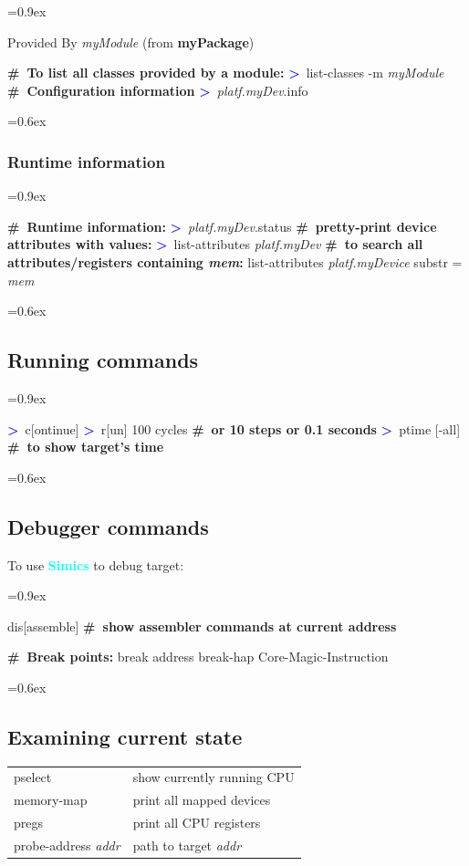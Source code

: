 \documentclass[8pt]{extarticle}
\newenvironment{code}[1][]{%
\begin{prebox}[#1]\obeylines%
\fontdimen2\font=0.9ex%
}{%
\end{prebox}%
\fontdimen2\font=0.6ex%
}
\newcommand{\ind}{\hphantom{~~~}}
\newcommand{\sprompt}{\textcolor{blue}{\textbf{>}\ }}
\newcommand{\cmtcommon}[1]{\textcolor{Sepia}{\textbf{#1}}}
\newcommand{\cmt}[1]{\cmtcommon{\#\ #1}}
\newcommand{\p}[1]{\textit{\large#1}}
\newcommand{\Simics}{\textcolor{cyan}{\textbf{Simics}}}
\begin{document}
\begin{multicols*}{3}
\begin{code}
    \vspace{0.3em}
    Provided By
    \ind   \p{myModule} (from \textbf{myPackage})
    \vspace{0.3em}

    \cmt{To list all classes provided by a module:}
    \sprompt list-classes -m \p{myModule}
    \cmt{Configuration information}
    \sprompt \p{platf.myDev}.info
\end{code}

\subsubsection{Runtime information}

\begin{code}
    \cmt{Runtime information:}
    \sprompt \p{platf.myDev}.status
    \cmt{pretty-print device attributes with values:}
    \sprompt list-attributes \p{platf.myDev}
    \cmt{to search all attributes/registers containing \p{mem}:}
    list-attributes \p{platf.myDevice} substr = \p{mem}
\end{code}


\subsection{Running commands}
\begin{code}
\sprompt c[ontinue]
\sprompt r[un] 100 cycles \ind \cmt{or 10 steps or 0.1 seconds}
\sprompt ptime [-all] \ind \cmt{to show target's time}
\end{code}

\subsection{Debugger commands}
To use \Simics{} to debug target:
\begin{code}
dis[assemble] \cmt{show assembler commands at current address}

\cmt{Break points:}
break address
break-hap Core-Magic-Instruction
\end{code}

\subsection{Examining current state}

\begin{tabular}{ll}
    pselect & show currently running CPU \\
    memory-map & print all mapped devices \\
    pregs & print all CPU registers \\
    probe-address \p{addr} & path to target \p{addr}
\end{tabular}


\end{multicols*}
\end{document}
